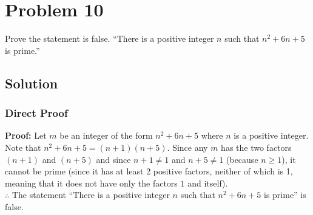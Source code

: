 \documentclass[table]{article}
\begin{document}
\section{Problem 10}
Prove the statement is false. ``There is a positive integer $n$ such that $n^2 + 6n + 5$ is prime.''
\subsection{Solution}
\subsubsection{Direct Proof}
\textbf{Proof:} Let $m$ be an integer of the form $n^2 + 6n + 5$ where $n$ is a positive integer.\\
Note that $n^2 + 6n + 5 = (n+1)(n+5)$. Since any $m$ has the two factors $(n+1)$ and $(n+5)$ and since $n + 1 \neq 1$ and $n + 5 \neq 1$ (because $n \geq 1$), it cannot be prime (since it has at least 2 positive factors, neither of which is 1, meaning that it does not have only the factors $1$ and itself).\\
$\therefore$ The statement ``There is a positive integer $n$ such that $n^2 + 6n + 5$ is prime'' is false.
\end{document}
